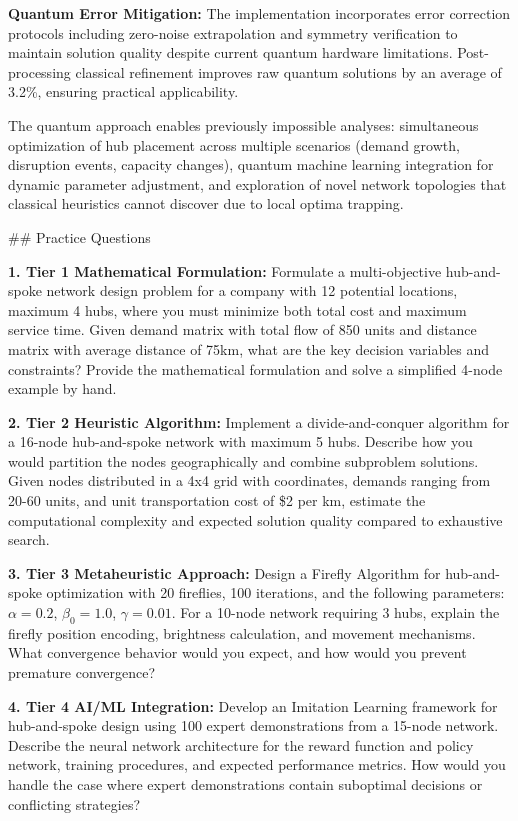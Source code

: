 \documentclass{article}
\begin{document}
\textbf{Quantum Error Mitigation:} The implementation incorporates error correction protocols including zero-noise extrapolation and symmetry verification to maintain solution quality despite current quantum hardware limitations. Post-processing classical refinement improves raw quantum solutions by an average of 3.2\%, ensuring practical applicability.

The quantum approach enables previously impossible analyses: simultaneous optimization of hub placement across multiple scenarios (demand growth, disruption events, capacity changes), quantum machine learning integration for dynamic parameter adjustment, and exploration of novel network topologies that classical heuristics cannot discover due to local optima trapping.

## Practice Questions

\textbf{1. Tier 1 Mathematical Formulation:}
Formulate a multi-objective hub-and-spoke network design problem for a company with 12 potential locations, maximum 4 hubs, where you must minimize both total cost and maximum service time. Given demand matrix with total flow of 850 units and distance matrix with average distance of 75km, what are the key decision variables and constraints? Provide the mathematical formulation and solve a simplified 4-node example by hand.

\textbf{2. Tier 2 Heuristic Algorithm:}
Implement a divide-and-conquer algorithm for a 16-node hub-and-spoke network with maximum 5 hubs. Describe how you would partition the nodes geographically and combine subproblem solutions. Given nodes distributed in a 4x4 grid with coordinates, demands ranging from 20-60 units, and unit transportation cost of \$2 per km, estimate the computational complexity and expected solution quality compared to exhaustive search.

\textbf{3. Tier 3 Metaheuristic Approach:}
Design a Firefly Algorithm for hub-and-spoke optimization with 20 fireflies, 100 iterations, and the following parameters: \( \alpha = 0.2 \), \( \beta_0 = 1.0 \), \( \gamma = 0.01 \). For a 10-node network requiring 3 hubs, explain the firefly position encoding, brightness calculation, and movement mechanisms. What convergence behavior would you expect, and how would you prevent premature convergence?

\textbf{4. Tier 4 AI/ML Integration:}
Develop an Imitation Learning framework for hub-and-spoke design using 100 expert demonstrations from a 15-node network. Describe the neural network architecture for the reward function and policy network, training procedures, and expected performance metrics. How would you handle the case where expert demonstrations contain suboptimal decisions or conflicting strategies?
\end{document}
